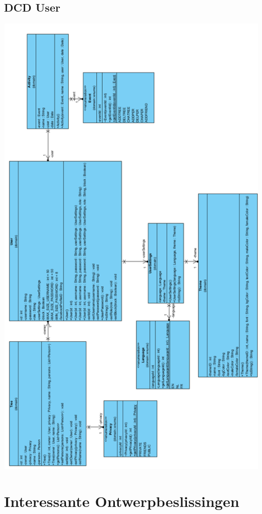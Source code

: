 \documentclass[pdftex,a4paper,12pt,twoside]{report}
\begin{document}
\section{DCD User}

\includegraphics[width=\textwidth]{images/DCDUser.png}\\



\chapter{Interessante Ontwerpbeslissingen}
\end{document}
